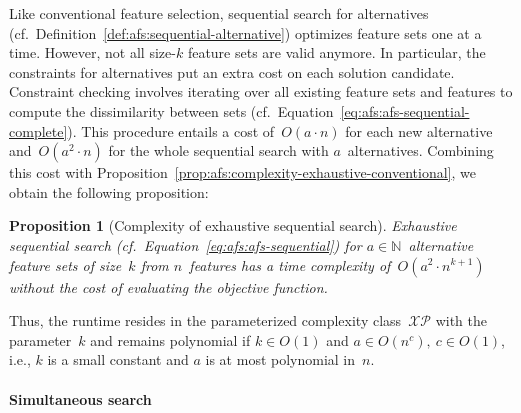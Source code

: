 \documentclass{article}
\newtheorem{proposition}{Proposition}
\theoremstyle{definition}
\begin{document}
Like conventional feature selection, sequential search for alternatives (cf.~Definition~\ref{def:afs:sequential-alternative}) optimizes feature sets one at a time.
However, not all size-$k$ feature sets are valid anymore.
In particular, the constraints for alternatives put an extra cost on each solution candidate.
Constraint checking involves iterating over all existing feature sets and features to compute the dissimilarity between sets (cf.~Equation~\ref{eq:afs:afs-sequential-complete}).
This procedure entails a cost of~$O(a \cdot n)$ for each new alternative and~$O(a^2 \cdot n)$ for the whole sequential search with $a$~alternatives.
Combining this cost with Proposition~\ref{prop:afs:complexity-exhaustive-conventional}, we obtain the following proposition:
%
\begin{proposition}[Complexity of exhaustive sequential search]
	Exhaustive sequential search (cf.~Equation~\ref{eq:afs:afs-sequential}) for $a \in \mathbb{N}$~alternative feature sets of size~$k$ from $n$~features has a time complexity of~$O(a^2 \cdot n^{k+1})$ without the cost of evaluating the objective function.
	\label{prop:afs:complexity-exhaustive-sequential}
\end{proposition}
%
Thus, the runtime resides in the parameterized complexity class~$\mathcal{XP}$ with the parameter~$k$ and remains polynomial if $k \in O(1)$ and $a \in O(n^c),~c \in O(1)$, i.e., $k$ is a small constant and $a$ is at most polynomial in~$n$.

\paragraph{Simultaneous search}
\end{document}

